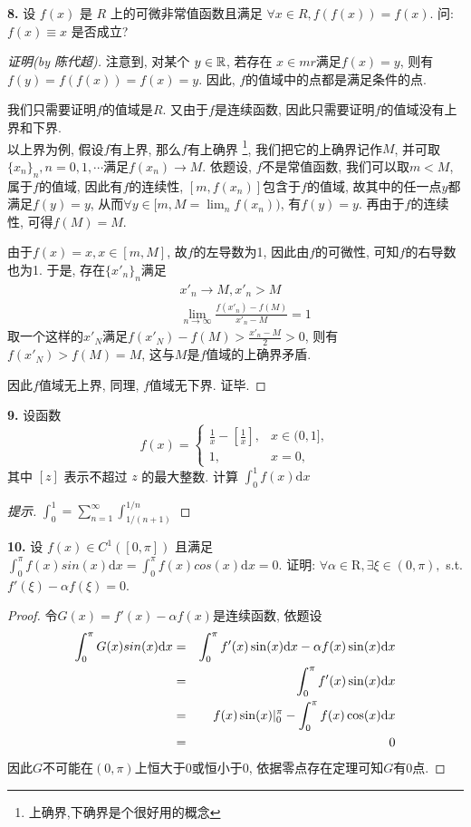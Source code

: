 \documentclass[a4paper,12pt]{article}
\theoremstyle{nonumberplain}
\begin{document}
\noindent \textbf{8.} 设 $f(x)$ 是 $R$ 上的可微非常值函数且满足 $\forall x\in R, f(f(x))=f(x)$. 
问: $f(x)\equiv x$ 是否成立?
\begin{proof}[证明(by 陈代超)]
  注意到, 对某个 $y\in \mathbb{R}$, 若存在 $x\in mr$满足$f(x)=y$, 
则有$f(y)=f(f(x))=f(x)=y$. 因此, $f$的值域中的点都是满足条件的点.

我们只需要证明$f$的值域是$R$.
又由于$f$是连续函数, 因此只需要证明$f$的值域没有上界和下界.\\
以上界为例, 假设$f$有上界, 那么$f$有上确界
\footnote{上确界,下确界是个很好用的概念}, 
我们把它的上确界记作$M$, 并可取$\{x_n\}_n,n=0,1,\cdots$满足$f(x_n)\to M$. 
依题设, $f$不是常值函数, 我们可以取$m<M$,
属于$f$的值域, 因此有$f$的连续性, $[m,f(x_n)]$包含于$f$的值域, 
故其中的任一点$y$都满足$f(y)=y$, 从而$\forall y\in [m,M=\lim_nf(x_n))$, 有$f(y)=y$.
再由于$f$的连续性, 可得$f(M)=M$. 

由于$f(x)=x,x\in[m,M]$, 故$f$的左导数为1, 因此由$f$的可微性, 可知$f$的右导数也为1. 
于是, 存在$\{x'_n\}_n$满足
\begin{eqnarray*}
  &&x'_n\to M, x'_n>M\\
  &&\lim_{n\to\infty}\frac{f(x'_n)-f(M)}{x'_n-M}=1
\end{eqnarray*}
取一个这样的$x'_N$满足$f(x'_N)-f(M)>\frac{x'_n-M}{2}>0$, 则有$f(x'_N)>f(M)=M$, 
这与$M$是$f$值域的上确界矛盾.

因此$f$值域无上界, 同理, $f$值域无下界. 证毕.
\end{proof}

\noindent \textbf{9.} 设函数
\[
f(x)=\left\{\begin{array}{ll}
\frac{1}{x}-[\frac{1}{x}], & x\in(0,1],\\
1,                         & x=0,
\end{array}\right.
\]
其中 $[z]$ 表示不超过 $z$ 的最大整数. 计算 $\int_0^1f(x)\mathrm{d}x$
\begin{proof}[提示]
  $\int_0^1=\sum_{n=1}^{\infty}\int_{1/(n+1)}^{1/n}$
\end{proof}

\noindent \textbf{10.} 设 $f(x)\in C^1([0,\pi])$ 且满足 
$\int_0^\pi f(x)sin(x)\mathrm{d}x=\int_0^\pi f(x)cos(x)\mathrm{d}x=0$. 证明: 
$\forall \alpha \in \mathrm{R}, \exists \xi \in (0,\pi), $ s.t. $ f'(\xi)-\alpha f(\xi)=0$.
\begin{proof}
  令$G(x)=f'(x)-\alpha f(x)$是连续函数, 依题设
\begin{eqnarray*}
  \int_0^\pi G(x)sin(x)\mathrm{d} x&=&\int_0^\pi f'(x)\sin(x)\mathrm{d} x-\alpha f(x)\sin(x)\mathrm{d} x\\
  &=&\int_0^\pi f'(x)\sin(x)\mathrm{d} x\\
  &=&f(x)\sin(x)\vert_0^\pi-\int_0^\pi f(x)\cos(x)\mathrm{d} x\\
  &=&0
\end{eqnarray*}
因此$G$不可能在$(0,\pi)$上恒大于0或恒小于0, 依据零点存在定理可知$G$有0点.
\end{proof}
\end{document}
